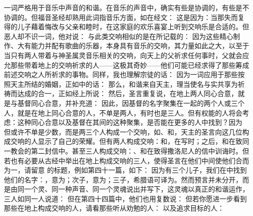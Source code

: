   一词严格用于音乐中声音的和谐。在音乐的声音中，确实有些是协调的，有些是不协调的。但福音圣经却熟用此词指音乐方面，如在经文：  这是因为：当那失而复得的儿子藉着悔改与父亲和睦时，在这家庭的欢乐喜宴上听到交响乐是合适的。但恶人却不识一词，他对说：  与此类交响相似的是在所记载的：  因为这些精心制作、大有能力并配有歌曲的乐器，本身具有音乐的交响，其力量如此之大，以至于当只有两人带着与神圣属灵音乐相关的交响，向天上的父祈求任何事时，父就会应允那些带着地上的交响祈求的人——这极其奇妙——他们可能已经求得了那些筹成前述交响之人所祈求的事物。同样，我也理解宗徒的话：  因为一词应用于那些按照天主所结的婚姻，正如中的话： 那么，和谐来自天主，理当使名与实共享为祈祷而达成的合一，正如经上所说：  然后，圣言重复说，在地上两人同心合意，就是与基督同心合意，并补充道：  因此，因基督的名字聚集在一起的两个人或三个人，就是在地上同心合意的人，不单是两人，有时也是三人。但有权能的人将会考虑：这种同心合意以及基督在其间的这种聚集，是否能在更多的人中找到？因为  但或许不单是少数，而是两三个人构成一个交响，如、和，天主的圣言向这几位构成交响的人显示了自己的荣耀。但有两人构成交响：和，在写时；之后，和在致同一教会的第二封信中。甚至三人构成交响：、和在致得撒洛尼人的信中训诲时。但若也有必要从古经中举出在地上构成交响的三人，使得圣言在他们中间使他们合而为一，请留意  的标题，例如第四十一篇，如下： 因为有三个儿子，我们在中找到他们的名字：，意为；次子，意为；三子，希腊语可译为。然而预言并未分开，而是由同一个灵、同一种声音、同一个灵魂说出并写下，这灵魂以真正的和谐运作，三人如同一人说道： 但在第四十四篇中，他们也用复数说： 但若你愿进一步看到那些在地上构成交响的人，请看那些听从劝勉的人：  以及追求目标的人：  